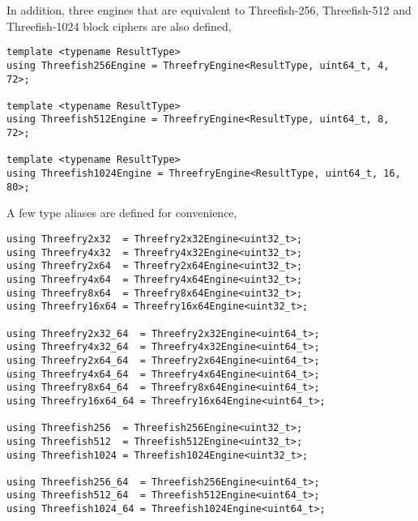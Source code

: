 In addition, three engines that are equivalent to Threefish-256, Threefish-512
and Threefish-1024 block ciphers are also defined,
\begin{verbatim}
template <typename ResultType>
using Threefish256Engine = ThreefryEngine<ResultType, uint64_t, 4, 72>;

template <typename ResultType>
using Threefish512Engine = ThreefryEngine<ResultType, uint64_t, 8, 72>;

template <typename ResultType>
using Threefish1024Engine = ThreefryEngine<ResultType, uint64_t, 16, 80>;
\end{verbatim}
A few type aliases are defined for convenience,
\begin{verbatim}
using Threefry2x32  = Threefry2x32Engine<uint32_t>;
using Threefry4x32  = Threefry4x32Engine<uint32_t>;
using Threefry2x64  = Threefry2x64Engine<uint32_t>;
using Threefry4x64  = Threefry4x64Engine<uint32_t>;
using Threefry8x64  = Threefry8x64Engine<uint32_t>;
using Threefry16x64 = Threefry16x64Engine<uint32_t>;

using Threefry2x32_64  = Threefry2x32Engine<uint64_t>;
using Threefry4x32_64  = Threefry4x32Engine<uint64_t>;
using Threefry2x64_64  = Threefry2x64Engine<uint64_t>;
using Threefry4x64_64  = Threefry4x64Engine<uint64_t>;
using Threefry8x64_64  = Threefry8x64Engine<uint64_t>;
using Threefry16x64_64 = Threefry16x64Engine<uint64_t>;

using Threefish256  = Threefish256Engine<uint32_t>;
using Threefish512  = Threefish512Engine<uint32_t>;
using Threefish1024 = Threefish1024Engine<uint32_t>;

using Threefish256_64  = Threefish256Engine<uint64_t>;
using Threefish512_64  = Threefish512Engine<uint64_t>;
using Threefish1024_64 = Threefish1024Engine<uint64_t>;
\end{verbatim}

\section{\texorpdfstring{\mkl \rng}{MKL RNG}}
\label{sec:MKL RNG}

